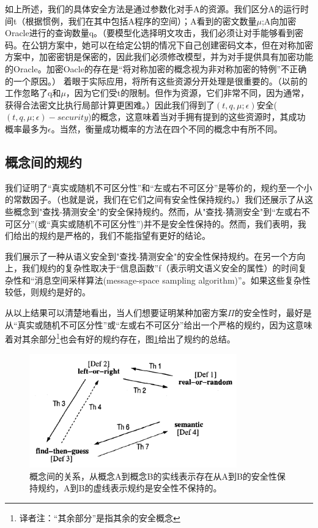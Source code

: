 \documentclass[]{article}
\begin{document}
如上所述，我们的具体安全方法是通过参数化对手A的资源。我们区分A的运行时间t（根据惯例，我们在其中包括A程序的空间）；A看到的密文数量$\mu$;A向加密Oracle进行的查询数量q。（要模型化选择明文攻击，我们必须让对手能够看到密码。在公钥方案中，她可以在给定公钥的情况下自己创建密码文本，但在对称加密方案中，加密密钥是保密的，因此我们必须修改模型，并为对手提供具有加密功能的Oracle。加密Oacle的存在是“将对称加密的概念视为非对称加密的特例”不正确的一个原因。）
着眼于实际应用，将所有这些资源分开处理是很重要的。（以前的工作忽略了q和$\mu$，因为它们受t的限制。但作为资源，它们非常不同，因为通常，获得合法密文比执行局部计算更困难。）因此我们得到了$(t,q,\mu;\epsilon)$安全($(t,q,\mu;\epsilon)-security$)的概念，这意味着当对手拥有提到的这些资源时，其成功概率最多为$\epsilon$。当然，衡量成功概率的方法在四个不同的概念中有所不同。\par

\subsection{概念间的规约}
我们证明了“真实或随机不可区分性”和“左或右不可区分”是等价的，规约至一个小的常数因子。（也就是说，我们在它们之间有安全性保持规约。）我们还展示了从这些概念到"查找-猜测安全"的安全保持规约。然而，从"查找-猜测安全"到“左或右不可区分”(或“真实或随机不可区分性”)并不是安全性保持的。然而，我们表明，我们给出的规约是严格的，我们不能指望有更好的结论。\par

我们展示了一种从语义安全到"查找-猜测安全"的安全性保持规约。在另一个方向上，我们规约的复杂性取决于“信息函数”f（表示明文语义安全的属性）的时间复杂性和“消息空间采样算法(message-space sampling algorithm)”。如果这些复杂性较低，则规约是好的。\par

从以上结果可以清楚地看出，当人们想要证明某种加密方案$\Pi$的安全性时，最好是从“真实或随机不可区分性”或“左或右不可区分”给出一个严格的规约，因为这意味着对其余部分\footnote{译者注：“其余部分”是指其余的安全概念}也会有好的规约存在，图\ref{Fig:fig1}给出了规约的总结。\par

\begin{figure}[htbp]
	\centering
	\includegraphics[width=0.8\textwidth]{Fig1.png}
	\caption{概念间的关系，从概念A到概念B的实线表示存在从A到B的安全性保持规约，A到B的虚线表示规约是安全性不保持的。}
	\label{Fig:fig1}
\end{figure}
\end{document}
